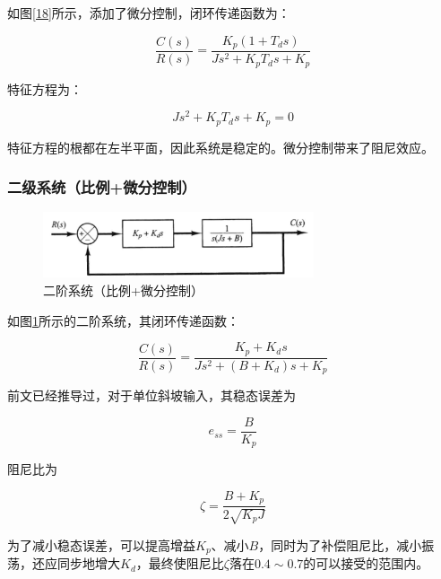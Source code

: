 如图\ref{18}所示，添加了微分控制，闭环传递函数为：

\begin{equation*}
\frac{C(s)}{R(s)}=\frac{K_p(1+T_ds)}{Js^2+K_pT_ds+K_p}
\end{equation*}

特征方程为：

\begin{equation*}
Js^2+K_pT_ds+K_p=0
\end{equation*}

特征方程的根都在左半平面，因此系统是稳定的。微分控制带来了阻尼效应。

\subsubsection{二级系统（比例+微分控制）}

\begin{figure}[!ht]
	\centering
	\includegraphics[width=8cm]{figures/19.png}
	\caption{二阶系统（比例+微分控制）}
	\label{19}
\end{figure}

如图\ref{19}所示的二阶系统，其闭环传递函数：

\begin{equation*}
\frac{C(s)}{R(s)}=\frac{K_p+K_ds}{Js^2+(B+K_d)s+K_p}
\end{equation*}

前文已经推导过，对于单位斜坡输入，其稳态误差为

\begin{equation*}
e_{ss}=\frac{B}{K_p}
\end{equation*}

阻尼比为

\begin{equation*}
\zeta=\frac{B+K_p}{2\sqrt{K_pJ}}
\end{equation*}

为了减小稳态误差，可以提高增益$K_p$、减小$B$，同时为了补偿阻尼比，减小振荡，还应同步地增大$K_d$，最终使阻尼比$\zeta$落在$0.4\sim0.7$的可以接受的范围内。




